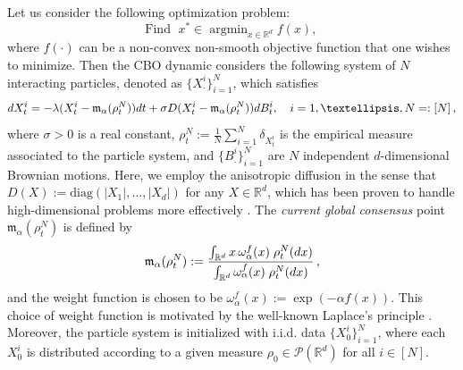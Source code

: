 \documentclass[12pt]{amsart}
\newcommand{\dt}{{\rm d} t}
\newcommand{\dx}{{\rm d} x}
\newcommand{\rd}{{\rm d} }
\newcommand{\RR}{{\mathbb R}}
\DeclareMathOperator*{\argmin}{argmin}
\numberwithin{equation}{section}
\begin{document}
Let us consider  the following optimization problem:
\begin{equation*}
	\text{Find }\; x^* \in \argmin_{x\in \RR^d} f(x),\,
\end{equation*}
where $f(\cdot)$ can be a non-convex non-smooth objective function that one wishes to minimize. Then the CBO dynamic considers the following system of $N$ interacting particles, denoted as $\{X_{\cdot}^i\}_{i=1}^N$, which satisfies
\begin{equation}\label{CBOparticle}
	\rd X_t^i=-\lambda(X_t^i - \mathfrak{m}_\alpha(\rho_t^{N}))\dt+\sigma D(X_t^i-\mathfrak{m}_\alpha(\rho_t^{N}))\rd B_t^{i},\quad i=1,\dots, N=:[N]\,,
\end{equation}
where  $\sigma>0$ is a real constant, $\rho_t^N:=\frac{1}{N}\sum_{i=1}^N\delta_{X_t^i}$ is the empirical measure associated to the particle system, and $\{B_.^i\}_{i=1}^N$ are $N$ independent $d$-dimensional Brownian motions.
 Here, we employ the anisotropic diffusion in the sense that $D(X):=\mbox{diag}(|X_1|,\dots,|X_d|)$ for any $X\in\RR^d$, which has been proven to handle high-dimensional problems more effectively \cite{carrillo2021consensus,fornasier2022anisotropic}.
The \textit{current global consensus} point $\mathfrak{m}_{\alpha}(\rho_t^N)$ is defined by
\begin{equation}\label{XaN}
	\mathfrak{m}_{\alpha}(\rho_t^N): = \frac{\int_{\RR^d} x \, \omega_{\alpha}^{f}(x)\; \rho_t^N(\dx)}{\int_{\RR^d}\omega_{\alpha}^{f}(x)\; \rho_t^N(\dx)}\,,
\end{equation}
and the weight function is chosen to be $\omega_\alpha^f(x):=\exp(-\alpha f(x))$.
This choice of weight function is motivated by the well-known Laplace's principle \cite{miller2006applied,MR2571413}. Moreover, the particle system is initialized with i.i.d. data $\{X_{0}^i\}_{i=1}^N$, where each $X_0^i$ is distributed according to a given measure $\rho_0 \in \mathscr{P}(\RR^d)$ for all $i \in [N]$.
\end{document}
